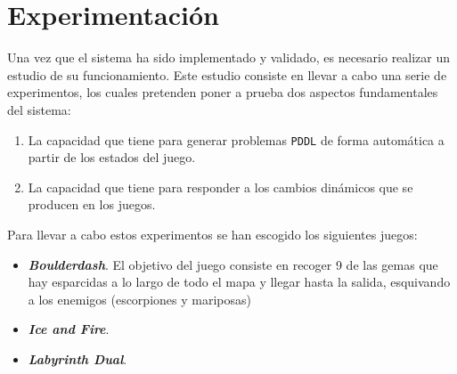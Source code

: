 
\chapter{Experimentación}

Una vez que el sistema ha sido implementado y validado, es necesario realizar un estudio
de su funcionamiento. Este estudio consiste en llevar a cabo una serie de experimentos,
los cuales pretenden poner a prueba dos aspectos fundamentales del sistema:

\begin{enumerate}
    \item La capacidad que tiene para generar problemas \texttt{PDDL} de forma
    automática a partir de los estados del juego.
    \item La capacidad que tiene para responder a los cambios dinámicos que
    se producen en los juegos.
\end{enumerate}

Para llevar a cabo estos experimentos se han escogido los siguientes juegos:

\begin{itemize}[label=\textbullet]
    \item \textbf{\textit{Boulderdash}}. El objetivo del juego consiste en recoger 9 de
    las gemas que hay esparcidas a lo largo de todo el mapa y llegar hasta la salida,
    esquivando a los enemigos (escorpiones y mariposas)
    
    \item \textbf{\textit{Ice and Fire}}.
    
    \item \textbf{\textit{Labyrinth Dual}}.
\end{itemize}

